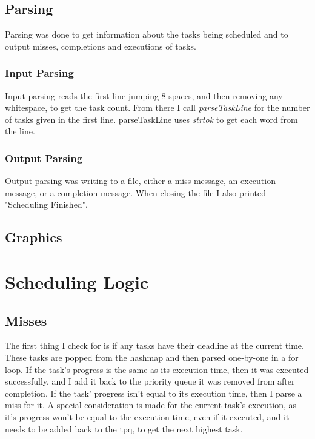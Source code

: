 \documentclass{article}
\begin{document}
    \subsection{Parsing}
    Parsing was done to get information about the tasks being scheduled and to output misses, completions and executions of tasks.
    \subsubsection{Input Parsing}
    Input parsing reads the first line jumping 8 spaces, and then removing any whitespace, to get the task count. \newline
    From there I call \textit{parseTaskLine} for the number of tasks given in the first line. \newline
    parseTaskLine uses \textit{strtok} to get each word from the line. 
    \subsubsection{Output Parsing}
    Output parsing was writing to a file, either a miss message, an execution message, or a completion message. \newline
    When closing the file I also printed "Scheduling Finished".
    \subsection{Graphics}
    \section{Scheduling Logic}
    \subsection{Misses}
    The first thing I check for is if any tasks have their deadline at the current time. \newline
    These tasks are popped from the hashmap and then parsed one-by-one in a for loop. \newline
    If the task's progress is the same as its execution time, then it was executed successfully, and I add it back to the priority queue it was removed from after completion. \newline
    If the task' progress isn't equal to its execution time, then I parse a miss for it. \newline
    A special consideration is made for the current task's execution, as it's progress won't be equal to the execution time, even if it executed, and it needs to be added back to the tpq, to get the next highest task. \newline
\end{document}
